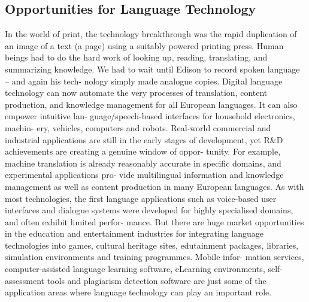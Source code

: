 \documentclass[]{../metanetpaper}
\begin{document}
\subsection{Opportunities for Language Technology}
In the world of print, the technology breakthrough was the rapid
duplication of an image of a text (a page) using a suitably powered
printing press. Human beings had to do the hard work of looking
up, reading, translating, and summarizing knowledge. We had to
wait until Edison to record spoken language – and again his tech-
nology simply made analogue copies.
Digital language technology can now automate the very processes
of translation, content production, and knowledge management for
all European languages. It can also empower intuitive lan-
guage/speech-based interfaces for household electronics, machin-
ery, vehicles, computers and robots. Real-world commercial and
industrial applications are still in the early stages of development,
yet R\&D achievements are creating a genuine window of oppor-
tunity. For example, machine translation is already reasonably
accurate in specific domains, and experimental applications pro-
vide multilingual information and knowledge management as well
as content production in many European languages.
As with most technologies, the first language applications such as
voice-based user interfaces and dialogue systems were developed
for highly specialised domains, and often exhibit limited perfor-
mance. But there are huge market opportunities in the education
and entertainment industries for integrating language technologies
into games, cultural heritage sites, edutainment packages, libraries,
simulation environments and training programmes. Mobile infor-
mation services, computer-assisted language learning software,
eLearning environments, self-assessment tools and plagiarism
detection software are just some of the application areas where
language technology can play an important role.
\end{document}

